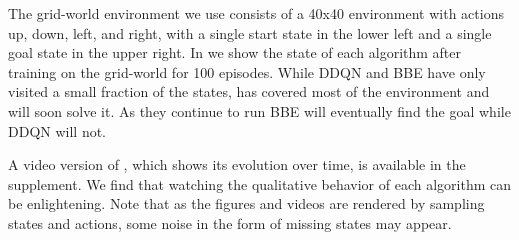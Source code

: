  \label{sec:gridworld-vis}

The grid-world environment we use consists of a 40x40 environment with actions up, down, left, and right, with a single start state in the lower left and a single goal state in the upper right.
In  we show the state of each algorithm after training on the grid-world for 100 episodes.
While DDQN and BBE have only visited a small fraction of the states, \algshort{} has covered most of the environment and will soon solve it.
As they continue to run BBE will eventually find the goal while DDQN will not.

A video version of , which shows its evolution over time, is available in the supplement.
We find that watching the qualitative behavior of each algorithm can be enlightening.
Note that as the figures and videos are rendered by sampling states and actions, some noise in the form of missing states may appear.

